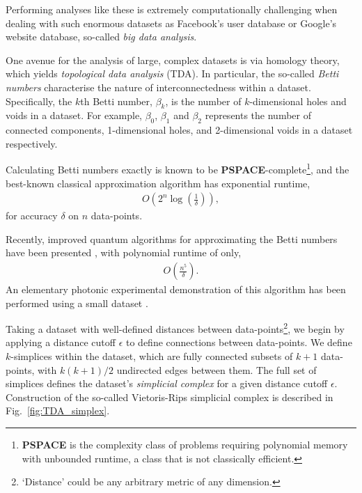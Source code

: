 Performing analyses like these is extremely computationally challenging when dealing with such enormous datasets as Facebook's user database or Google's website database, so-called \textit{big data analysis}.

One avenue for the analysis of large, complex datasets is via homology theory, which yields \textit{topological data analysis} (TDA). In particular, the so-called \textit{Betti numbers} characterise the nature of interconnectedness within a dataset. Specifically, the $k$th Betti number, $\beta_k$, is the number of $k$-dimensional holes and voids in a dataset. For example, $\beta_0$, $\beta_1$ and $\beta_2$ represents the number of connected components, 1-dimensional holes, and 2-dimensional voids in a dataset respectively.

Calculating Betti numbers exactly is known to be \textbf{PSPACE}-complete\footnote{\textbf{PSPACE} is the complexity class of problems requiring polynomial memory with unbounded runtime, a class that is not classically efficient.}, and the best-known classical approximation algorithm has exponential runtime,
\begin{align}
O\left(2^n \log \left(\frac{1}{\delta}\right)\right),
\end{align}
for accuracy $\delta$ on $n$ data-points.

Recently, improved quantum algorithms for approximating the Betti numbers have been presented \cite{bib:lloyd2016quantum, bib:PhysRevLett.113.130503, bib:GiovannettiLloyd08}, with polynomial runtime of only,
\begin{align}
O\left(\frac{n^5}{\delta}\right).
\end{align}
An elementary photonic experimental demonstration of this algorithm has been performed using a small dataset \cite{bib:LuRohdeTDAopt}.

Taking a dataset with well-defined distances between data-points\footnote{`Distance' could be any arbitrary metric of any dimension.}, we begin by applying a distance cutoff $\epsilon$ to define connections between data-points. We define $k$-simplices within the dataset, which are fully connected subsets of \mbox{$k+1$} data-points, with \mbox{$k(k+1)/2$} undirected edges between them. The full set of simplices defines the dataset's \textit{simplicial complex} for a given distance cutoff $\epsilon$. Construction of the so-called Vietoris-Rips simplicial complex is described in Fig.~\ref{fig:TDA_simplex}.

